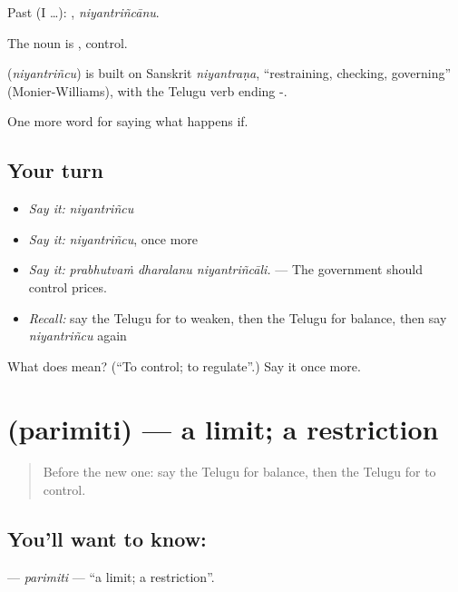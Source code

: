 Past (I …): , \emph{niyantriñcānu}.

The noun is , control.

\begin{cousinweb}
\textbf{} (\emph{niyantriñcu}) is built on Sanskrit \emph{niyantraṇa}, \textquotedblleft{}restraining, checking, governing\textquotedblright{} (Monier-Williams), with the Telugu verb ending -.
\end{cousinweb}

\begin{grammarlens}[title={What you've built}]
One more word for saying what happens if.
\end{grammarlens}

\subsection*{Your turn}
\begin{itemize}
\raggedright
  \item \emph{Say it:} \emph{niyantriñcu}
  \item \emph{Say it:} \emph{niyantriñcu}, once more
  \item \emph{Say it:} \emph{prabhutvaṁ dharalanu niyantriñcāli.} — The government should control prices.
  \item \emph{Recall:} say the Telugu for to weaken, then the Telugu for balance, then say \emph{niyantriñcu} again
\end{itemize}

\begin{tcolorbox}[breakable,colback=teal!4,colframe=teal!35!black,title={Before you move on}]
What does  mean? (\textquotedblleft{}To control; to regulate\textquotedblright{}.) Say it once more.
\end{tcolorbox}
\section[\texorpdfstring{\te{పరిమితి} (parimiti)}{పరిమితి (parimiti)}]{ (parimiti) — a limit; a restriction}

\label{lesson:TE-C430-parimiti}



\begin{quote}
Before the new one: say the Telugu for balance, then the Telugu for to control.
\end{quote}

\subsection*{You'll want to know: }
\textbf{} — \emph{parimiti} — \textquotedblleft{}a limit; a restriction\textquotedblright{}.

